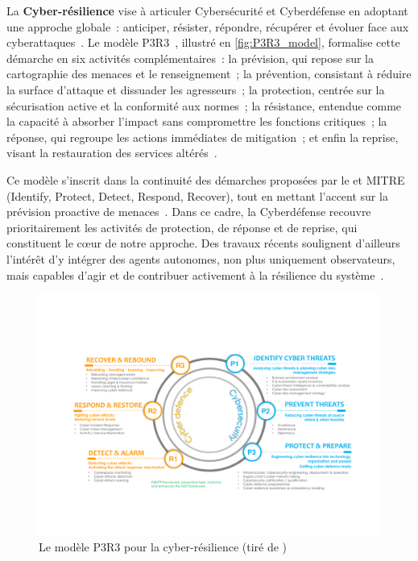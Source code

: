 La \textbf{Cyber-résilience} vise à articuler Cybersécurité et Cyberdéfense en adoptant une approche globale~: anticiper, résister, répondre, récupérer et évoluer face aux cyberattaques~\cite{NISTresilience}. Le modèle P3R3~\cite{Theron2013P3R3}, illustré en \autoref{fig:P3R3_model}, formalise cette démarche en six activités complémentaires~: la prévision, qui repose sur la cartographie des menaces et le renseignement~; la prévention, consistant à réduire la surface d'attaque et dissuader les agresseurs~; la protection, centrée sur la sécurisation active et la conformité aux normes~; la résistance, entendue comme la capacité à absorber l'impact sans compromettre les fonctions critiques~; la réponse, qui regroupe les actions immédiates de mitigation~; et enfin la reprise, visant la restauration des services altérés~\cite{Theron2013P3R3}.

Ce modèle s'inscrit dans la continuité des démarches proposées par le  et MITRE (Identify, Protect, Detect, Respond, Recover), tout en mettant l'accent sur la prévision proactive de menaces~\cite{Theron2013P3R3}. Dans ce cadre, la Cyberdéfense recouvre prioritairement les activités de protection, de réponse et de reprise, qui constituent le cœur de notre approche. Des travaux récents soulignent d'ailleurs l'intérêt d'y intégrer des agents autonomes, non plus uniquement observateurs, mais capables d'agir et de contribuer activement à la résilience du système~\cite{Kott2023}.

\begin{figure}[h]
    \centering
    \includegraphics[width=\linewidth]{figures/P3R3.pdf}
    \caption{Le modèle P3R3 pour la cyber-résilience (tiré de \autocite{Kott2023})}
    \label{fig:P3R3_model}
\end{figure}

